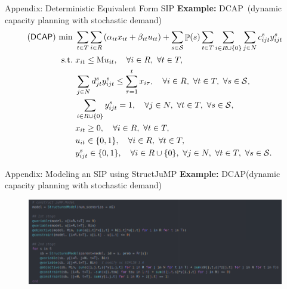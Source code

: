 \documentclass{beamer}
\def\eight{\fontsize{8pt}{8pt}\selectfont}
\newcommand{\structjump}{\textsf{StructJuMP}}
\newcommand{\dcap}{\textsf{DCAP}}
\DeclareMathOperator*{\PP}{\mathbb{P}}
\begin{document}
	\begin{frame}[noframenumbering]{Appendix: Deterministic Equivalent Form SIP}
		\textbf{Example:} \dcap\ (dynamic capacity planning with stochastic demand)
		\eight
		\begin{subequations} \label{dcap:formulation}
			\begin{align}
			\textrm{(\dcap) }\textrm{min}\ &\sum_{t\in T}\sum_{i\in R}\left(\alpha_{it}x_{it}+\beta_{it}u_{it}\right)+\sum_{s\in\mathcal{S}}\PP(s)\sum_{t\in T}\sum_{i\in R\cup\{0\}}\sum_{j\in N}c_{ijt}^{s}y_{ijt}^s	\label{dcap:obj} \\
			\textrm{s.t.}\ & x_{it}\le \textrm{M}u_{it},\quad\forall i\in R,\ \forall t\in T,	\label{dcap:b}\\
			&\sum_{j\in N}d_{jt}^s y_{ijt}^s\le\sum_{\tau=1}^{t}x_{i\tau},\quad\forall i\in R,\ \forall t\in T,\ \forall s\in\mathcal{S},\label{dcap:c}\\
			&\sum_{i\in R\cup \{0\}}y_{ijt}^s=1,\quad\forall j\in N,\ \forall t\in T,\ \forall s\in\mathcal{S}, \label{dcap:d} \\
			&x_{it}\ge 0,\quad\forall i\in R,\ \forall t\in T,\label{dcap:e} \\
			&u_{it}\in\{0,1\}, \quad\forall i\in R,\ \forall t\in T,\label{dcap:f}\\
			&y_{ijt}^s\in\{0,1\},\quad\forall i\in R\cup\{0\},\ \forall j\in N,\ \forall t\in T,\ \forall s\in\mathcal{S}.\label{dcap:g}
			\end{align}
		\end{subequations}
	\end{frame}

	\begin{frame}[noframenumbering]{Appendix: Modeling an SIP using \structjump}
		\textbf{Example:} \dcap (dynamic capacity planning with stochastic demand)
		\begin{figure}
			\centering
			\includegraphics[width=\textwidth,keepaspectratio]{DCAP_modeling}
		\end{figure}
	\end{frame}
\end{document}

